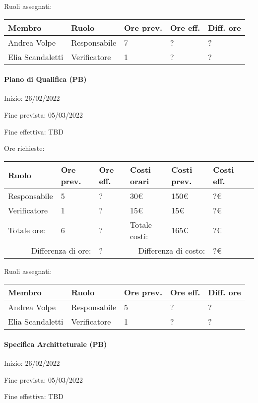 \documentclass[a4paper, 12pt]{article}
\begin{document}
Ruoli assegnati:\\[0.5em]
\begin{tabular}{|l|l|l|l|l|}\hline
Membro & Ruolo & Ore prev. & Ore eff. & Diff. ore \\\hline
Andrea Volpe & Responsabile & 7 & ? & ? \\\hline
Elia Scandaletti & Verificatore & 1 & ? & ? \\\hline
\end{tabular}

\paragraph{Piano di Qualifica (PB)}
Inizio: 26/02/2022\par
Fine prevista: 05/03/2022\par
Fine effettiva: TBD

Ore richieste:\\[0.5em]
\begin{tabular}{|l|l|l||l|l|l|l|}\hline
Ruolo & Ore prev. & Ore eff. & Costi orari & Costi prev. & Costi eff.\\\hline
Responsabile & 5 & ? & 30\euro & 150\euro & ?\euro \\\hline
Verificatore & 1 & ? & 15\euro & 15\euro & ?\euro \\\hline
Totale ore: & 6 & ? & Totale costi: & 165\euro & ?\euro \\\hline
\multicolumn{2}{|r|}{Differenza di ore:} & ? & \multicolumn{2}{r|}{Differenza di costo:} & ?\euro \\\hline
\end{tabular}

Ruoli assegnati:\\[0.5em]
\begin{tabular}{|l|l|l|l|l|}\hline
Membro & Ruolo & Ore prev. & Ore eff. & Diff. ore \\\hline
Andrea Volpe & Responsabile & 5 & ? & ? \\\hline
Elia Scandaletti & Verificatore & 1 & ? & ? \\\hline
\end{tabular}

\paragraph{Specifica Architteturale (PB)}
Inizio: 26/02/2022\par
Fine prevista: 05/03/2022\par
Fine effettiva: TBD
\end{document}
